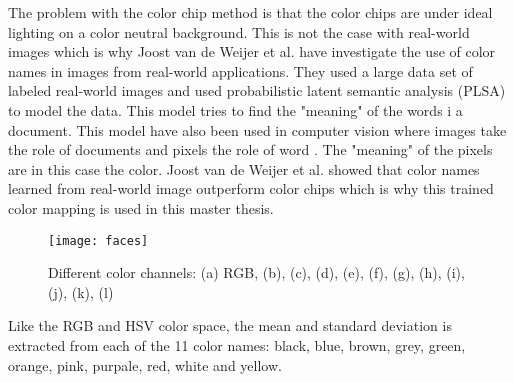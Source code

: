The problem with the color chip method is that the color chips are under ideal lighting on a color neutral background. This is not the case with real-world images which is why Joost van de Weijer et al. \cite{11_colours} have investigate the use of color names in images from real-world applications. They used a large data set of labeled real-world images and used probabilistic latent semantic analysis (PLSA) \cite{hofmann1999probabilistic} to model the data. This model tries to find the "meaning" of the words i a document. This model have also been used in computer vision where images take the role of documents and pixels the role of word \cite{barnard2003matching}. The "meaning" of the pixels are in this case the color. Joost van de Weijer et al. showed that color names learned from real-world image outperform color chips which is why this trained color mapping is used in this master thesis. 

\FloatBarrier
\begin{figure}[h]
	\centering
	\texttt{[image: faces]}
	\caption{Different color channels: (a) RGB, (b), (c), (d), (e), (f), (g), (h), (i), (j), (k), (l)  \label{fig:per_vs_non}}
\end{figure}
\FloatBarrier

Like the RGB and HSV color space, the mean and standard deviation is extracted from each of the 11 color names: black, blue, brown, grey, green, orange, pink, purpale, red, white and yellow. 




%
%
%

